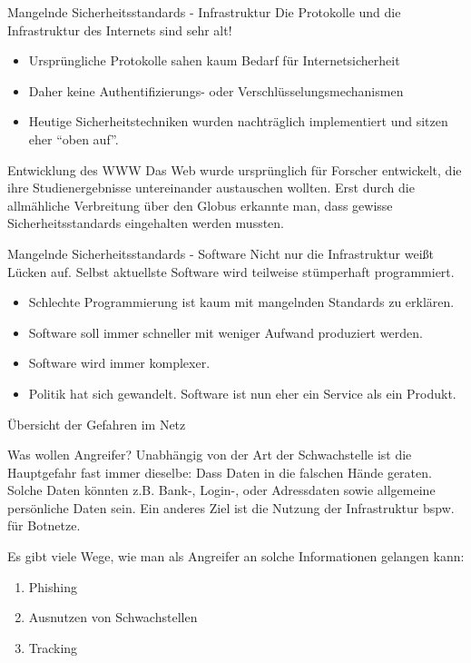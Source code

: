 \documentclass[hyperref={colorlinks,linkcolor=blue}, utf8]{beamer}
\begin{document}
	\begin{frame}{Mangelnde Sicherheitsstandards - Infrastruktur}
		\alert{Die Protokolle und die Infrastruktur des Internets sind sehr alt!}
		
		\begin{itemize}
			\item Ursprüngliche Protokolle sahen kaum Bedarf für Internetsicherheit
			\item Daher keine Authentifizierungs- oder Verschlüsselungsmechanismen
			\item Heutige Sicherheitstechniken wurden nachträglich implementiert und sitzen eher \enquote{oben auf}.
		\end{itemize}
	
		\begin{block}{Entwicklung des WWW}
			Das Web wurde ursprünglich für Forscher entwickelt, die ihre Studienergebnisse untereinander austauschen wollten. Erst durch die allmähliche Verbreitung über den Globus erkannte man, dass gewisse Sicherheitsstandards eingehalten werden mussten.
		\end{block}		
	\end{frame}

	\begin{frame}{Mangelnde Sicherheitsstandards - Software}
		Nicht nur die Infrastruktur weißt Lücken auf. Selbst aktuellste Software wird teilweise stümperhaft programmiert.
		\begin{itemize}
			\item Schlechte Programmierung ist kaum mit mangelnden Standards zu erklären.
			\item Software soll immer schneller mit weniger Aufwand produziert werden.
			\item Software wird immer komplexer.
			\item Politik hat sich gewandelt. Software ist nun eher ein Service als ein Produkt.
		\end{itemize}
	\end{frame}

	\begin{frame}{Übersicht der Gefahren im Netz}
		\begin{block}{Was wollen Angreifer?}
			Unabhängig von der Art der Schwachstelle ist die Hauptgefahr fast immer dieselbe: Dass Daten in die falschen Hände geraten. Solche Daten könnten z.B. Bank-, Login-, oder Adressdaten sowie allgemeine persönliche Daten sein. Ein anderes Ziel ist die Nutzung der Infrastruktur bspw. für Botnetze.
		\end{block}
		
		Es gibt viele Wege, wie man als Angreifer an solche Informationen gelangen kann:
		\begin{enumerate}
			\item Phishing
			\item Ausnutzen von Schwachstellen
			\item Tracking			
		\end{enumerate}
	\end{frame}
\end{document}
